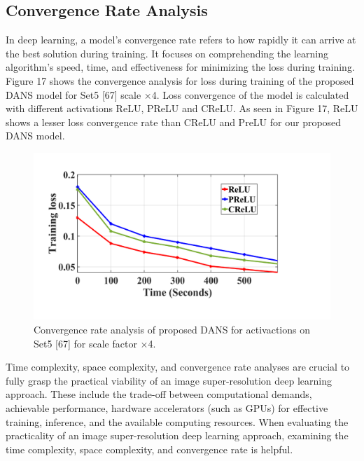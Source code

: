 \documentclass{ieeeaccess}
\begin{document}
\subsection{Convergence Rate Analysis}

In deep learning, a model's convergence rate refers to how rapidly it can arrive at the best solution during training. It focuses on comprehending the learning algorithm's speed, time, and effectiveness for minimizing the loss during training. Figure 17 shows the convergence analysis for loss during training of the proposed DANS model for Set5 [67] scale ×4. Loss convergence of the model is calculated with different activations ReLU, PReLU and CReLU. As seen in Figure 17, ReLU shows a lesser loss convergence rate than CReLU and PreLU for our proposed DANS model. 

\begin{figure}
  \includegraphics[width=\linewidth]{17FIGURE.pdf}
  \caption{Convergence rate analysis of proposed DANS for activactions on Set5 [67] for scale factor $\times$4.}
  \label{fig:17}
\end{figure}

Time complexity, space complexity, and convergence rate analyses are crucial to fully grasp the practical viability of an image super-resolution deep learning approach. These include the trade-off between computational demands, achievable performance, hardware accelerators (such as GPUs) for effective training, inference, and the available computing resources. When evaluating the practicality of an image super-resolution deep learning approach, examining the time complexity, space complexity, and convergence rate is helpful.
\end{document}
